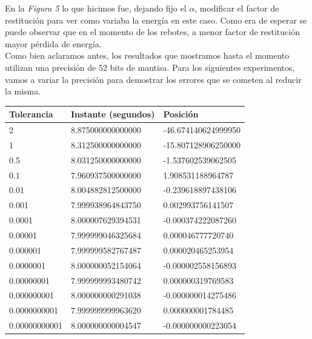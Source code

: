 \documentclass[a4paper]{article}
\begin{document}
En la \textit{Figura 5} lo que hicimos fue, dejando fijo el $\alpha$, modificar el factor de restitución para ver como variaba la energía en este caso. Como era de esperar se puede observar que en el momento de los rebotes, a menor factor de restitución mayor pérdida de energía.\\[1em]

Como bien aclaramos antes, los resultados que mostramos hasta el momento utilizan una precisión de 52 bits de mantisa. Para los siguientes experimentos, vamos a variar la precisión para demostrar los errores que se cometen al reducir la misma.
  
\vspace{2em}
\begin{center}
\begin{tabular}{|l|l|l|}
  \hline
  Tolerancia & Instante (segundos) & Posición \\
  \hline
  2 & 8.875000000000000 & -46.674140624999950 \\
  1 &  8.312500000000000 & -15.807128906250000 \\
  0.5 & 8.031250000000000 & -1.537602539062505 \\
  0.1 & 7.960937500000000 & 1.908531188964787 \\
  0.01 & 8.004882812500000 & -0.239618897438106 \\
  0.001 & 7.999938964843750 & 0.002993756141507 \\
  0.0001 & 8.000007629394531 & -0.000374222087260 \\
  0.00001 & 7.999999046325684 & 0.000046777720740 \\
  0.000001 & 7.999999582767487 & 0.000020465253954 \\
  0.0000001 & 8.000000052154064 & -0.000002558156893 \\
  0.00000001 & 7.999999993480742 & 0.000000319769583 \\
  0.000000001 & 8.000000000291038 & -0.000000014275486 \\
  0.0000000001 & 7.999999999963620 & 0.000000001784485 \\
  0.00000000001 & 8.000000000004547 & -0.000000000223054 \\
\hline
\end{tabular}
\end{center} 
\vspace{1em}
\end{document}
